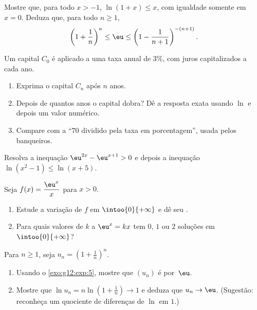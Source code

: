 \begin{exercise}[$\star\star$]\label{exo:g12:exp:5}
Mostre que, para todo $x > -1$, $\ln(1 + x) \leq x$, com igualdade somente
em $x = 0$. Deduza que, para todo $n \geq 1$,
\[
\left(1 + \frac{1}{n}\right)^n \leq \eu \leq \left(1 - \frac{1}{n+1}\right)^{-(n+1)} .
\]
\end{exercise}

\begin{exercise}[$\star\star$]\label{exo:g12:exp:6}
Um capital $C_0$ é aplicado a uma taxa anual de $3\%$, com juros
capitalizados a cada ano.
\begin{enumerate}
  \item Exprima o capital $C_n$ após $n$ anos.
  \item Depois de quantos anos o capital dobra? Dê a resposta exata usando
        $\ln$ e depois um valor numérico.
  \item Compare com a  ``$70$ dividido pela taxa em
        porcentagem'', usada pelos banqueiros.
\end{enumerate}
\end{exercise}

\begin{exercise}[$\star\star$]\label{exo:g12:exp:7}
Resolva a inequação $\eu^{2x} - \eu^{x+1} > 0$ e depois a inequação
$\ln(x^2 - 1) \leq \ln(x + 5)$.
\end{exercise}

\begin{exercise}[$\star\star\star$]\label{exo:g12:exp:8}
Seja $f(x) = \dfrac{\eu^x}{x}$ para $x > 0$.
\begin{enumerate}
  \item Estude a variação de $f$ em $\intoo{0}{+\infty}$ e dê seu .
  \item Para quais valores de $k$ a  $\eu^x = kx$ tem $0$, $1$ ou
        $2$ soluções em $\intoo{0}{+\infty}$?
\end{enumerate}
\end{exercise}

\begin{exercise}[$\star\star\star$]\label{exo:g12:exp:9}
Para $n \geq 1$, seja $u_n = \left(1 + \frac1n\right)^n$.
\begin{enumerate}
  \item Usando o \cref{exo:g12:exp:5}, mostre que $(u_n)$ é  por~$\eu$.
  \item Mostre que $\ln u_n = n \ln\left(1 + \frac1n\right) \to 1$ e deduza
        que $u_n \to \eu$. (Sugestão: reconheça um quociente de diferenças
        de $\ln$ em $1$.)
\end{enumerate}
\end{exercise}

